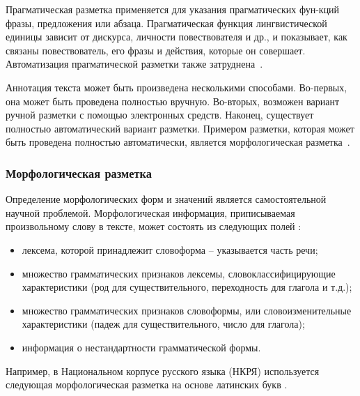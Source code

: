 Прагматическая разметка применяется для указания прагматических фун-кций фразы, предложения или абзаца. 
Прагматическая функция лингвистической единицы зависит от дискурса, личности повествователя и др., и показывает, как связаны повествователь, его фразы и действия, которые он совершает. 
Автоматизация прагматической разметки также затруднена~\cite{archer-pragmatic-annotation-2008}.

Аннотация текста может быть произведена несколькими способами. 
Во-первых, она может быть проведена полностью вручную. 
Во-вторых, возможен вариант ручной разметки с помощью электронных средств. 
Наконец, существует полностью автоматический вариант разметки. 
Примером разметки, которая может быть проведена полностью автоматически, является морфологическая разметка~\cite{szudarski-corpus-linguistics-for-vocab-2017}.

\subsubsection{Морфологическая разметка}

Определение морфологических форм и значений является самостоятельной научной проблемой. 
Морфологическая информация, приписываемая произвольному слову в тексте, может состоять из следующих полей \cite{annotation-russian}:

\begin{itemize}[label=---]
	\item лексема, которой принадлежит словоформа -- указывается часть речи;
	
	\item множество грамматических признаков лексемы, словоклассифицирующие характеристики (род для существительного, переходность для глагола и т.д.);
	
	\item множество грамматических признаков словоформы, или словоизменительные характеристики (падеж для существительного, число для глагола);
	
	\item информация о нестандартности грамматической формы.
\end{itemize}

Например, в Национальном корпусе русского языка (НКРЯ) \cite{ruscorpora} используется следующая морфологическая разметка на основе латинских букв \cite{annotation-russian}.

